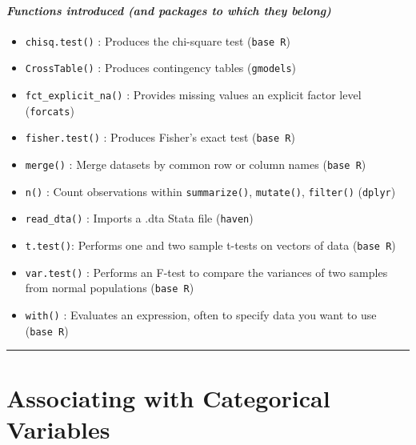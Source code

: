 \documentclass[
]{book}
\providecommand{\tightlist}{%
  \setlength{\itemsep}{0pt}\setlength{\parskip}{0pt}}
\begin{document}
\hypertarget{functions-introduced-and-packages-to-which-they-belong-6}{%
\paragraph*{\texorpdfstring{\emph{Functions introduced (and packages to which they belong)}}{Functions introduced (and packages to which they belong)}}\label{functions-introduced-and-packages-to-which-they-belong-6}}

\begin{itemize}
\tightlist
\item
  \texttt{chisq.test()} : Produces the chi-square test (\texttt{base\ R})
\item
  \texttt{CrossTable()} : Produces contingency tables (\texttt{gmodels})
\item
  \texttt{fct\_explicit\_na()} : Provides missing values an explicit factor level (\texttt{forcats})
\item
  \texttt{fisher.test()} : Produces Fisher's exact test (\texttt{base\ R})
\item
  \texttt{merge()} : Merge datasets by common row or column names (\texttt{base\ R})
\item
  \texttt{n()} : Count observations within \texttt{summarize()}, \texttt{mutate()}, \texttt{filter()} (\texttt{dplyr})
\item
  \texttt{read\_dta()} : Imports a .dta Stata file (\texttt{haven})
\item
  \texttt{t.test()}: Performs one and two sample t-tests on vectors of data (\texttt{base\ R})
\item
  \texttt{var.test()} : Performs an F-test to compare the variances of two samples from normal populations (\texttt{base\ R})
\item
  \texttt{with()} : Evaluates an expression, often to specify data you want to use (\texttt{base\ R})
\end{itemize}

\begin{center}\rule{0.5\linewidth}{0.5pt}\end{center}

\hypertarget{associating-with-categorical-variables}{%
\section{Associating with Categorical Variables}\label{associating-with-categorical-variables}}
\end{document}
